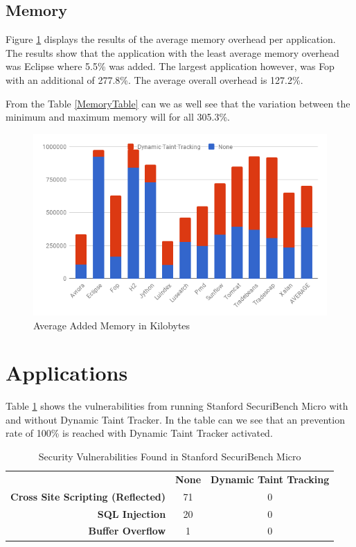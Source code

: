 \subsection{Memory}
Figure \ref{fig:Memory} displays the results of the average memory overhead per application. The results show that the application with the least average memory overhead was Eclipse where 5.5\% was added. The largest application however, was Fop with an additional of 277.8\%. The average overall overhead is 127.2\%.

From the Table \ref{MemoryTable} can we as well see that the variation between the minimum and maximum memory will for all 305.3\%.

\begin{figure}[H]
	\centering
	\includegraphics[width=\textwidth]{images/Memory.png}
	\caption{Average Added Memory in Kilobytes}
	\label{fig:Memory}
\end{figure}



\section{Applications}
Table \ref{table:MicroTable} shows the vulnerabilities from running Stanford SecuriBench Micro \parencite{securiBenchMicro} with and without Dynamic Taint Tracker. In the table can we see that an prevention rate of 100\% is reached with Dynamic Taint Tracker activated.

\begin{table}[H]
  \centering
  \caption{Security Vulnerabilities Found in Stanford SecuriBench Micro}
  \label{table:MicroTable}
    \begin{tabular}{rcc}
      & \textbf{None} & \textbf{Dynamic Taint Tracking} \\
      \textbf{Cross Site Scripting (Reflected)} & 71            & 0  \\
      \textbf{SQL Injection}                    & 20            & 0  \\
      \textbf{Buffer Overflow}                  & 1             & 0  
    \end{tabular}
\end{table}


